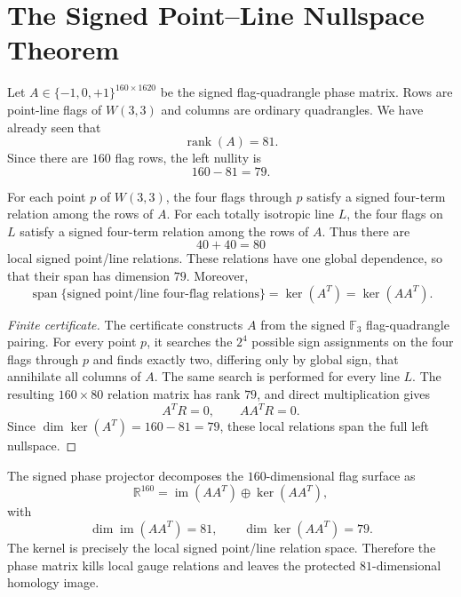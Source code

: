 
\section{The Signed Point--Line Nullspace Theorem}
\label{sec:signed-point-line-nullspace}

Let $A\in\{-1,0,+1\}^{160\times1620}$ be the signed flag-quadrangle phase matrix.
Rows are point-line flags of $W(3,3)$ and columns are ordinary quadrangles.  We have
already seen that
\[
        \operatorname{rank}(A)=81.
\]
Since there are $160$ flag rows, the left nullity is
\[
        160-81=79.
\]

\begin{theorem}
For each point $p$ of $W(3,3)$, the four flags through $p$ satisfy a signed four-term
relation among the rows of $A$.  For each totally isotropic line $L$, the four flags
on $L$ satisfy a signed four-term relation among the rows of $A$.  Thus there are
\[
        40+40=80
\]
local signed point/line relations.  These relations have one global dependence, so
that their span has dimension $79$.  Moreover,
\[
        \operatorname{span}\{\text{signed point/line four-flag relations}\}
        =\ker(A^T)=\ker(AA^T).
\]
\end{theorem}

\begin{proof}[Finite certificate]
The certificate constructs $A$ from the signed $\mathbb F_3$ flag-quadrangle pairing.
For every point $p$, it searches the $2^4$ possible sign assignments on the four flags
through $p$ and finds exactly two, differing only by global sign, that annihilate all
columns of $A$.  The same search is performed for every line $L$.  The resulting
$160\times80$ relation matrix has rank $79$, and direct multiplication gives
\[
        A^T R=0,
        \qquad
        AA^T R=0.
\]
Since $\dim\ker(A^T)=160-81=79$, these local relations span the full left nullspace.
\end{proof}

\begin{corollary}
The signed phase projector decomposes the $160$-dimensional flag surface as
\[
        \mathbb R^{160}
        =\operatorname{im}(AA^T)\oplus\ker(AA^T),
\]
with
\[
        \dim\operatorname{im}(AA^T)=81,
        \qquad
        \dim\ker(AA^T)=79.
\]
The kernel is precisely the local signed point/line relation space.  Therefore the
phase matrix kills local gauge relations and leaves the protected $81$-dimensional
homology image.
\end{corollary}
